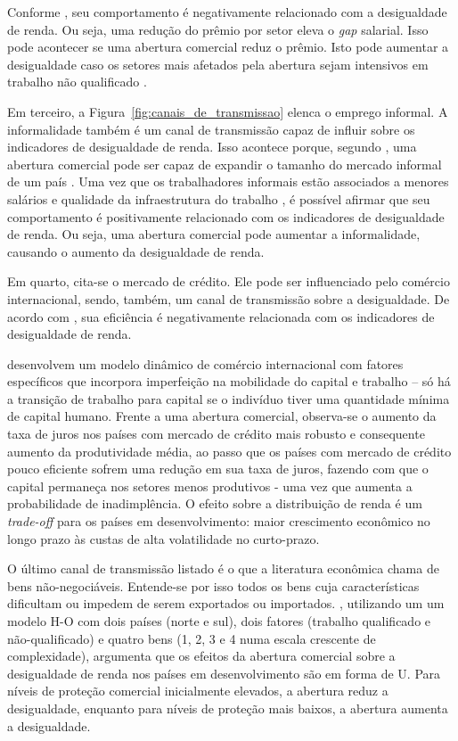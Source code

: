 Conforme \textcite{goldbergpavcnik04}, seu comportamento é negativamente relacionado com a desigualdade de renda. Ou seja, uma redução do prêmio por setor eleva o \textit{gap} salarial. Isso pode acontecer se uma abertura comercial reduz o prêmio. Isto pode aumentar a desigualdade caso os setores mais afetados pela abertura sejam intensivos em trabalho não qualificado \cite{pavcnik04}.

Em terceiro, a Figura~\ref{fig:canais_de_transmissao} elenca o emprego informal. A informalidade também é um canal de transmissão capaz de influir sobre os indicadores de desigualdade de renda. Isso acontece porque, segundo \textcite{goldbergpavcnik04}, uma abertura comercial pode ser capaz de expandir o tamanho do mercado informal de um país \cite{goldberg03}. Uma vez que os trabalhadores informais estão associados a menores salários e qualidade da infraestrutura do trabalho \cite{bargain14}, é possível afirmar que seu comportamento é positivamente relacionado com os indicadores de desigualdade de renda. Ou seja, uma abertura comercial pode aumentar a informalidade, causando o aumento da desigualdade de renda.

Em quarto, cita-se o mercado de crédito. Ele pode ser influenciado pelo comércio internacional, sendo, também, um canal de transmissão sobre a desigualdade. De acordo com \textcite{goldbergpavcnik04}, sua eficiência é negativamente relacionada com os indicadores de desigualdade de renda.

\textcite{banerjee04} desenvolvem um modelo dinâmico de comércio internacional com fatores específicos que incorpora imperfeição na mobilidade do capital e trabalho -- só há a transição de trabalho para capital se o indivíduo tiver uma quantidade mínima de capital humano. Frente a uma abertura comercial, observa-se o aumento da taxa de juros nos países com mercado de crédito mais robusto e consequente aumento da produtividade média, ao passo que os países com mercado de crédito pouco eficiente sofrem uma redução em sua taxa de juros, fazendo com que o capital permaneça nos setores menos produtivos - uma vez que aumenta a probabilidade de inadimplência. O efeito sobre a distribuição de renda é um \textit{trade-off} para os países em desenvolvimento: maior crescimento econômico no longo prazo às custas de alta volatilidade no curto-prazo.

O último canal de transmissão listado é o que a literatura econômica chama de bens não-negociáveis. Entende-se por isso todos os bens cuja características dificultam ou impedem de serem exportados ou importados. \textcite{xu03}, utilizando um um modelo H-O com dois países (norte e sul), dois fatores (trabalho qualificado e não-qualificado) e quatro bens (1, 2, 3 e 4 numa escala crescente de complexidade), argumenta que os efeitos da abertura comercial sobre a desigualdade de renda nos países em desenvolvimento são em forma de U. Para níveis de proteção comercial inicialmente elevados, a abertura reduz a desigualdade, enquanto para níveis de proteção mais baixos, a abertura aumenta a desigualdade.

